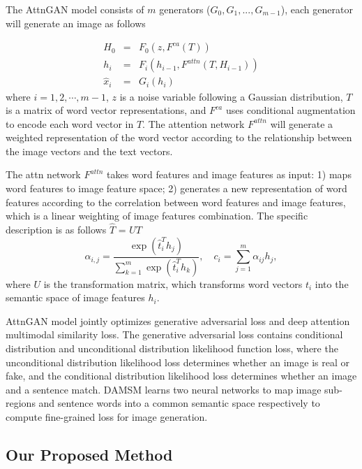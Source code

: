 \documentclass[runningheads, orivec]{llncs}
\begin{document}
The AttnGAN model consists of $m$ generators ($G_{0}, G_{1},..., G_{m-1}$), each generator will generate an image as follows

\begin{eqnarray}
     H_0 & = & F_0(z,F^{ca}(T)) \\
     h_i & = & F_i(h_{i - 1}, F^{attn}(T,H_{i - 1})) \\
     \hat{x}_i & = & G_i(h_i)    
\end{eqnarray}
where $i = 1,2,\cdots,m - 1$, $z$ is a noise variable following a Gaussian distribution, $T$ is a matrix of word vector representations, and $F^{ca}$ uses conditional augmentation to encode each word vector in $T$. The attention network $F^{attn}$ will generate a weighted representation of the word vector according to the relationship between the image vectors and the text vectors.

The attn network $F^{attn}$ takes word features and image features as input: 1) maps word features to image feature space; 2) generates a new representation of word features according to the correlation between word features and image features, which is a linear weighting of image features combination. The specific description is as follows
$\hat{T}$  =  $U T$ \\
\begin{equation}
    \alpha_{i,j}  = \frac{\exp (\hat{t}_i^T h_j)}{\sum_{k = 1}^{m} \exp (\hat{t}_i^T h_k)},\quad
c_i  =  \sum_{j = 1}^m \alpha_{ij} h_j,
\end{equation}
where $U$ is the transformation matrix, which transforms word vectors $t_i$ into the semantic space of image features $h_i$.

AttnGAN model jointly optimizes generative adversarial loss and deep attention multimodal similarity loss. The generative adversarial loss contains conditional distribution and unconditional distribution likelihood function loss, where the unconditional distribution likelihood loss determines whether an image is real or fake, and the conditional distribution likelihood loss determines whether an image and a sentence match. DAMSM learns two neural networks to map image sub-regions and sentence words into a common semantic space respectively to compute fine-grained loss for image generation.

\subsection{Our Proposed Method}
\end{document}
